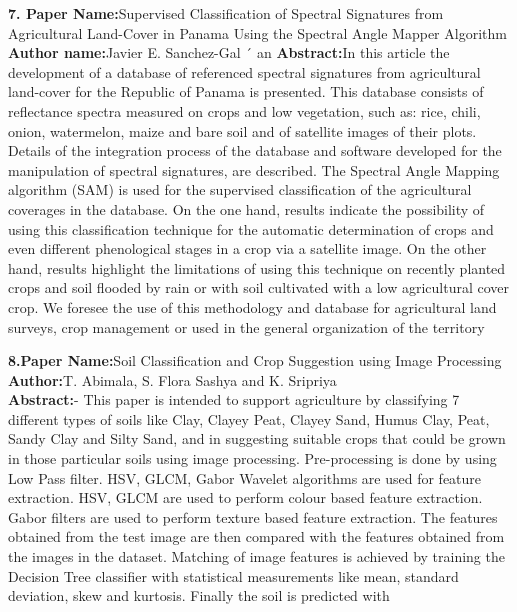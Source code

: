 \documentclass[oneside,a4paper,12pt]{report}
\begin{document}
\newpage
\item \textbf{7. Paper Name:}Supervised Classification of Spectral Signatures
from Agricultural Land-Cover in Panama Using the
Spectral Angle Mapper Algorithm\\
\textbf{Author name:}Javier E. Sanchez-Gal ´ an
\textbf{Abstract:}In this article the development of a database of
referenced spectral signatures from agricultural land-cover for
the Republic of Panama is presented. This database consists of
reflectance spectra measured on crops and low vegetation, such
as: rice, chili, onion, watermelon, maize and bare soil and of
satellite images of their plots. Details of the integration process
of the database and software developed for the manipulation of
spectral signatures, are described. The Spectral Angle Mapping
algorithm (SAM) is used for the supervised classification of the
agricultural coverages in the database. On the one hand, results
indicate the possibility of using this classification technique for the
automatic determination of crops and even different phenological
stages in a crop via a satellite image. On the other hand, results
highlight the limitations of using this technique on recently
planted crops and soil flooded by rain or with soil cultivated
with a low agricultural cover crop. We foresee the use of this
methodology and database for agricultural land surveys, crop
management or used in the general organization of the territory\\
\newpage
\item \textbf{8.Paper Name:}Soil Classification and Crop Suggestion using
Image Processing\\
\textbf{Author:}T. Abimala, S. Flora Sashya and K. Sripriya\\
\textbf{Abstract:}- This paper is intended to support agriculture by 
classifying 7 different types of soils like Clay, Clayey Peat, 
Clayey Sand, Humus Clay, Peat, Sandy Clay and Silty Sand, 
and in suggesting suitable crops that could be grown in those 
particular soils using image processing. Pre-processing is done 
by using Low Pass filter. HSV, GLCM, Gabor Wavelet 
algorithms are used for feature extraction. HSV, GLCM are 
used to perform colour based feature extraction. Gabor filters 
are used to perform texture based feature extraction. The 
features obtained from the test image are then compared with 
the features obtained from the images in the dataset. Matching 
of image features is achieved by training the Decision Tree 
classifier with statistical measurements like mean, standard 
deviation, skew and kurtosis. Finally the soil is predicted with 
\end{document}
